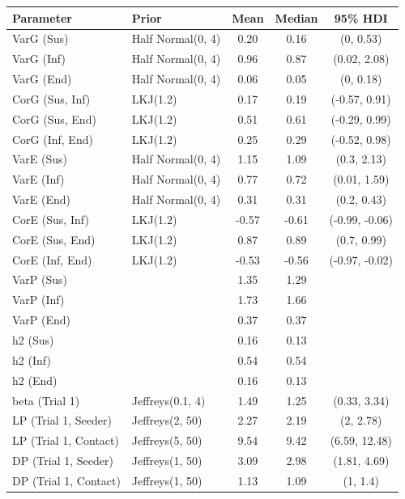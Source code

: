 \begin{table}[!htpb]
\centering
\begin{tabular}{llS[table-format=3.2]S[table-format=3.2]c}
  \toprule
Parameter & Prior & Mean & Median & 95\% HDI \\ 
  \midrule
VarG (Sus) & Half Normal(0, 4) & 0.20 & 0.16 & (0, 0.53) \\ 
  VarG (Inf) & Half Normal(0, 4) & 0.96 & 0.87 & (0.02, 2.08) \\ 
  VarG (End) & Half Normal(0, 4) & 0.06 & 0.05 & (0, 0.18) \\ 
  CorG (Sus, Inf) & LKJ(1.2) & 0.17 & 0.19 & (-0.57, 0.91) \\ 
  CorG (Sus, End) & LKJ(1.2) & 0.51 & 0.61 & (-0.29, 0.99) \\ 
  CorG (Inf, End) & LKJ(1.2) & 0.25 & 0.29 & (-0.52, 0.98) \\ 
  VarE (Sus) & Half Normal(0, 4) & 1.15 & 1.09 & (0.3, 2.13) \\ 
  VarE (Inf) & Half Normal(0, 4) & 0.77 & 0.72 & (0.01, 1.59) \\ 
  VarE (End) & Half Normal(0, 4) & 0.31 & 0.31 & (0.2, 0.43) \\ 
  CorE (Sus, Inf) & LKJ(1.2) & -0.57 & -0.61 & (-0.99, -0.06) \\ 
  CorE (Sus, End) & LKJ(1.2) & 0.87 & 0.89 & (0.7, 0.99) \\ 
  CorE (Inf, End) & LKJ(1.2) & -0.53 & -0.56 & (-0.97, -0.02) \\ 
  VarP (Sus) &  & 1.35 & 1.29 &  \\ 
  VarP (Inf) &  & 1.73 & 1.66 &  \\ 
  VarP (End) &  & 0.37 & 0.37 &  \\ 
  h2 (Sus) &  & 0.16 & 0.13 &  \\ 
  h2 (Inf) &  & 0.54 & 0.54 &  \\ 
  h2 (End) &  & 0.16 & 0.13 &  \\ 
  beta (Trial 1) & Jeffreys(0.1, 4) & 1.49 & 1.25 & (0.33, 3.34) \\ 
  LP (Trial 1, Seeder) & Jeffreys(2, 50) & 2.27 & 2.19 & (2, 2.78) \\ 
  LP (Trial 1, Contact) & Jeffreys(5, 50) & 9.54 & 9.42 & (6.59, 12.48) \\ 
  DP (Trial 1, Seeder) & Jeffreys(1, 50) & 3.09 & 2.98 & (1.81, 4.69) \\ 
  DP (Trial 1, Contact) & Jeffreys(1, 50) & 1.13 & 1.09 & (1, 1.4) \\ 

\end{tabular}
\end{table}
